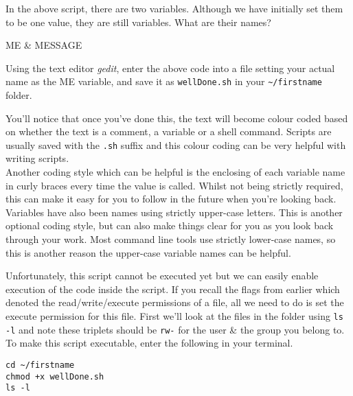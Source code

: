\begin{questions}
In the above script, there are two variables. 
Although we have initially set them to be one value, they are still variables.
What are their names? 
\begin{answer}
ME \& MESSAGE
\end{answer}
\end{questions}

\begin{steps}
Using the text editor \textit{gedit}, enter the above code into a file setting your actual name as the ME variable,  and save it as \texttt{wellDone.sh} in your \texttt{\~{}/firstname} folder.\\
\end{steps}

\begin{information}
You'll notice that once you've done this, the text will become colour coded based on whether the text is a comment, a variable or a shell command.
Scripts are usually saved with the \texttt{.sh} suffix and this colour coding can be very helpful with writing scripts.\\

Another coding style which can be helpful is the enclosing of each variable name in curly braces every time the value is called.
Whilst not being strictly required, this can make it easy for you to follow in the future when you're looking back.
Variables have also been names using strictly upper-case letters.
This is another optional coding style, but can also make things clear for you as you look back through your work.
Most command line tools use strictly lower-case names, so this is another reason the upper-case variable names can be helpful.
\end{information}

\begin{steps}
Unfortunately, this script cannot be executed yet but we can easily enable execution of the code inside the script.
If you recall the flags from earlier which denoted the read/write/execute permissions of a file, all we need to do is set the execute permission for this file.
First we'll look at the files in the folder using \texttt{ls -l} and note these triplets should be \texttt{rw-} for the user \& the group you belong to.
To make this script executable, enter the following in your terminal.
\begin{lstlisting}
cd ~/firstname
chmod +x wellDone.sh
ls -l
\end{lstlisting}
\end{steps}

